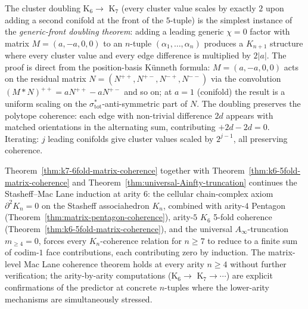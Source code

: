 \begin{remark}
\label{rem:k7-generic-front-doubling}
The cluster doubling K$_6 \rightarrow$ K$_7$ \textup{(}every cluster
value scales by exactly $2$ upon adding a second conifold at the front
of the $5$-tuple\textup{)} is the simplest instance of the
\emph{generic-front doubling theorem}: adding a leading generic
$\chi = 0$ factor with matrix $M = (a, -a, 0, 0)$ to an $n$-tuple
$(\alpha_1, \ldots, \alpha_n)$ produces a $K_{n + 1}$ structure where
every cluster value and every edge difference is multiplied by $2|a|$.
The proof is direct from the position-basis K\"unneth formula:
$M = (a, -a, 0, 0)$ acts on the residual matrix
$N = (N^{++}, N^{+-}, N^{-+}, N^{--})$ via the convolution
$(M \mathbin{\ast} N)^{++} = aN^{++} - aN^{+-}$ and so on; at $a = 1$
\textup{(}conifold\textup{)} the result is a uniform scaling on the
$\sigma_{\mathrm{tot}}^*$-anti-symmetric part of $N$. The doubling
preserves the polytope coherence: each edge with non-trivial difference
$2 d$ appears with matched orientations in the alternating sum,
contributing $+ 2d - 2d = 0$. Iterating: $j$ leading conifolds give
cluster values scaled by $2^{j - 1}$, all preserving coherence.
\end{remark}

\begin{remark}
\label{rem:k7-coherence-implies-higher}
Theorem~\ref{thm:k7-6fold-matrix-coherence} together with
Theorem~\ref{thm:k6-5fold-matrix-coherence} and
Theorem~\ref{thm:universal-Ainfty-truncation} continues the
Stasheff--Mac Lane induction at arity $6$: the cellular chain-complex
axiom $\partial^2 K_n = 0$ on the Stasheff associahedron $K_n$,
combined with arity-$4$ Pentagon
\textup{(}Theorem~\ref{thm:matrix-pentagon-coherence}\textup{),}
arity-$5$ $K_6$ 5-fold coherence
\textup{(}Theorem~\ref{thm:k6-5fold-matrix-coherence}\textup{),} and the
universal $A_\infty$-truncation $m_{\geq 4} = 0$, forces every
$K_n$-coherence relation for $n \geq 7$ to reduce to a finite sum of
codim-$1$ face contributions, each contributing zero by induction.
The matrix-level Mac Lane coherence theorem holds at every arity
$n \geq 4$ without further verification; the arity-by-arity computations
\textup{(}K$_6 \to$ K$_7 \to \cdots$\textup{)} are explicit confirmations
of the predictor at concrete $n$-tuples where the lower-arity mechanisms
are simultaneously stressed.
\end{remark}

